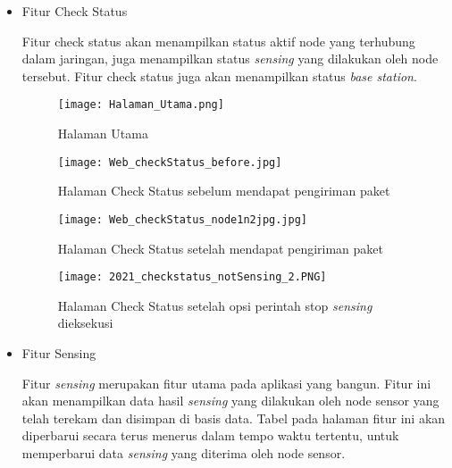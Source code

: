     \begin{itemize}
        \item Fitur Check Status
        
        Fitur check status akan menampilkan status aktif node yang terhubung dalam jaringan, juga menampilkan status \textit{sensing} yang dilakukan oleh node tersebut. Fitur check status juga akan menampilkan status \textit{base station}.
        \begin{figure}[H]
        	\centering  
        	\texttt{[image: Halaman\_Utama.png]}  
        	\caption[Halaman Utama]{ Halaman Utama} 
        	\label{fig: Halaman Utama} 
        \end{figure}
        
        \begin{figure}[H]
        	\centering  
        	\texttt{[image: Web\_checkStatus\_before.jpg]}  
        	\caption[Halaman Check Status sebelum mendapat pengiriman paket]{Halaman Check Status sebelum mendapat pengiriman paket} 
        	\label{fig:Halaman Check Status sebelum mendapat pengiriman paket} 
        \end{figure}
        
        \begin{figure}[H]
        	\centering  
        	\texttt{[image: Web\_checkStatus\_node1n2jpg.jpg]}  
        	\caption[Halaman Check Status setelah mendapat pengiriman paket]{Halaman Check Status setelah mendapat pengiriman paket} 
        	\label{fig:Halaman Check Status setelah mendapat pengiriman paket} 
        \end{figure}
        
        \begin{figure}[H]
        	\centering  
        	\texttt{[image: 2021\_checkstatus\_notSensing\_2.PNG]}  
        	\caption[Halaman Check Status setelah opsi perintah stop \textit{sensing} dieksekusi]{Halaman Check Status setelah opsi perintah stop \textit{sensing} dieksekusi} 
        	\label{fig:Halaman Check Status setelah opsi perintah stop sensing dieksekusi} 
        \end{figure}
        
        \item Fitur Sensing
        
        Fitur \textit{sensing} merupakan fitur utama pada aplikasi yang bangun. Fitur ini akan menampilkan data hasil \textit{sensing} yang dilakukan oleh node sensor yang telah terekam dan disimpan di basis data. Tabel pada halaman fitur ini akan diperbarui secara terus menerus dalam tempo waktu tertentu, untuk memperbarui data \textit{sensing} yang diterima oleh node sensor.  
        

\end{itemize}

